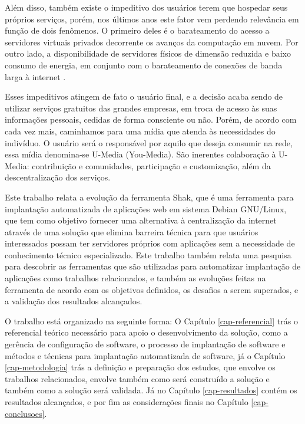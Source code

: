 Além disso, também existe o impeditivo dos usuários terem que hospedar seus próprios serviços,
porém, nos últimos anos este fator vem perdendo relevância em função de
dois fenômenos. O primeiro deles é o barateamento do acesso a servidores virtuais
privados decorrente os avanços da computação em nuvem. Por outro lado, a
disponibilidade de servidores físicos de dimensão reduzida e baixo consumo de
energia, em conjunto com o barateamento de conexões de banda larga à internet \cite{shak2015}.

Esses impeditivos atingem de fato o usuário final, e a decisão
acaba sendo de utilizar serviços gratuitos das grandes empresas, em troca de acesso
às suas informações pessoais, cedidas de forma consciente ou não. Porém, de acordo
com \cite{terra2006comunicaccao} cada vez mais, caminhamos
para uma mídia que atenda às necessidades do indivíduo. O usuário será o responsável
por aquilo que deseja consumir na rede, essa mídia denomina-se U-Media (You-Media).
São inerentes colaboração à U-Media: contribuição e comunidades, participação
e customização, além da descentralização dos serviços.

Este trabalho relata a evolução da ferramenta Shak, que é uma ferramenta para implantação
automatizada de aplicações web em sistema Debian GNU/Linux, que tem como objetivo fornecer
uma alternativa à centralização da internet através de uma solução que elimina
barreira técnica para que usuários interessados possam ter servidores próprios
com aplicações sem a necessidade de conhecimento
técnico especializado. Este trabalho também relata uma pesquisa para
descobrir as ferramentas que são utilizadas para automatizar implantação de aplicações
como trabalhos relacionados, e também as evoluções feitas na ferramenta de acordo
com os objetivos definidos, os desafios a serem superados, e a validação dos
resultados alcançados.

O trabalho está organizado na seguinte forma:  O Capítulo \ref{cap-referencial}
trás o referencial teórico necessário para apoio o desenvolvimento da solução,
como a gerência de configuração de software, o processo de implantação de software
 e métodos e técnicas para implantação automatizada de software, já o Capítulo 
\ref{cap-metodologia}
trás a definição e preparação dos estudos, que envolve os trabalhos relacionados, 
envolve também como será construído a solução e também como a solução será validada. 
Já no Capítulo \ref{cap-resultados} contém os resultados alcançados, e por fim as
considerações finais no Capítulo \ref{cap-conclusoes}.

